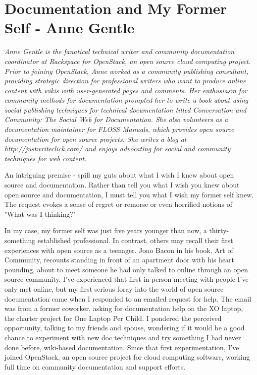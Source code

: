 \section{Documentation and My Former Self - Anne Gentle}

\textit{Anne Gentle is the fanatical technical writer and community documentation coordinator at Rackspace for OpenStack, an open source cloud computing project. Prior to joining OpenStack, Anne worked as a community publishing consultant, providing strategic direction for professional writers who want to produce online content with wikis with user-generated pages and comments. Her enthusiasm for community methods for documentation prompted her to write a book about using social publishing techniques for technical documentation titled Conversation and Community: The Social Web for Documentation. She also volunteers as a documentation maintainer for FLOSS Manuals, which provides open source documentation for open source projects. She writes a blog at http://justwriteclick.com/ and enjoys advocating for social and community techniques for web content.}

An intriguing premise - spill my guts about what I wish I knew about open source and documentation. Rather than tell you what I wish you knew about open source and documentation, I must tell you what I wish my former self knew. The request evokes a sense of regret or remorse or even horrified notions of "What was I thinking?" 

In my case, my former self was just five years younger than now, a thirty-something established professional. In contrast, others may recall their first experiences with open source as a teenager. Jono Bacon in his book, Art of Community, recounts standing in front of an apartment door with his heart pounding, about to meet someone he had only talked to online through an open source community. I've experienced that first in-person meeting with people I've only met online, but my first serious foray into the world of open source documentation came when I responded to an emailed request for help. The email was from a former coworker, asking for documentation help on the XO laptop, the charter project for One Laptop Per Child. I pondered the perceived opportunity, talking to my friends and spouse, wondering if it would be a good chance to experiment with new doc techniques and try something I had never done before, wiki-based documentation. Since that first experimentation, I've joined OpenStack, an open source project for cloud computing software, working full time on community documentation and support efforts. 

